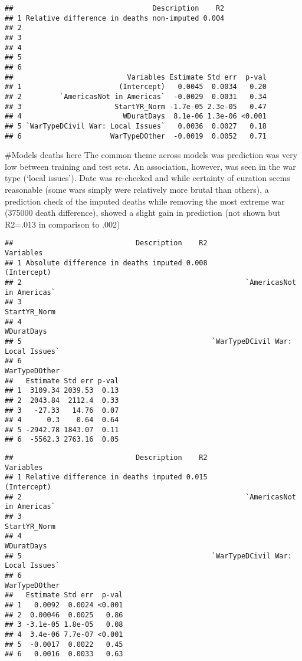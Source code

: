 \documentclass[
]{article}
\begin{document}
\begin{verbatim}
##                                 Description    R2
## 1 Relative difference in deaths non-imputed 0.004
## 2                                                
## 3                                                
## 4                                                
## 5                                                
## 6                                                
##                           Variables Estimate Std err  p-val
## 1                       (Intercept)   0.0045  0.0034   0.20
## 2         `AmericasNot in Americas`  -0.0029  0.0031   0.34
## 3                      StartYR_Norm -1.7e-05 2.3e-05   0.47
## 4                        WDuratDays  8.1e-06 1.3e-06 <0.001
## 5 `WarTypeDCivil War: Local Issues`   0.0036  0.0027   0.18
## 6                     WarTypeDOther  -0.0019  0.0052   0.71
\end{verbatim}

\#Models deaths here The common theme across models was prediction was
very low between training and test sets. An association, however, was
seen in the war type (`local issues'). Date was re-checked and while
certainty of curation seems reasonable (some wars simply were relatively
more brutal than others), a prediction check of the imputed deaths while
removing the most extreme war (375000 death difference), showed a slight
gain in prediction (not shown but R2=.013 in comparison to .002)

\begin{verbatim}
##                             Description    R2                         Variables
## 1 Absolute difference in deaths imputed 0.008                       (Intercept)
## 2                                                     `AmericasNot in Americas`
## 3                                                                  StartYR_Norm
## 4                                                                    WDuratDays
## 5                                             `WarTypeDCivil War: Local Issues`
## 6                                                                 WarTypeDOther
##   Estimate Std err p-val
## 1  3109.34 2039.53  0.13
## 2  2043.84  2112.4  0.33
## 3   -27.33   14.76  0.07
## 4      0.3    0.64  0.64
## 5 -2942.78 1843.07  0.11
## 6  -5562.3 2763.16  0.05
\end{verbatim}

\begin{verbatim}
##                             Description    R2                         Variables
## 1 Relative difference in deaths imputed 0.015                       (Intercept)
## 2                                                     `AmericasNot in Americas`
## 3                                                                  StartYR_Norm
## 4                                                                    WDuratDays
## 5                                             `WarTypeDCivil War: Local Issues`
## 6                                                                 WarTypeDOther
##   Estimate Std err  p-val
## 1   0.0092  0.0024 <0.001
## 2  0.00046  0.0025   0.86
## 3 -3.1e-05 1.8e-05   0.08
## 4  3.4e-06 7.7e-07 <0.001
## 5  -0.0017  0.0022   0.45
## 6   0.0016  0.0033   0.63
\end{verbatim}
\end{document}
